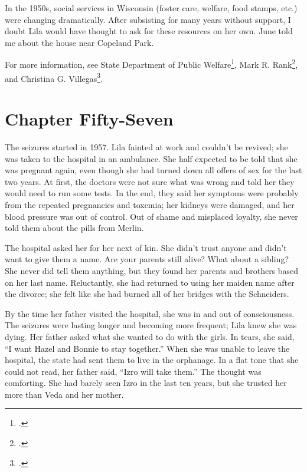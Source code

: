 \documentclass[
  letterpaper,
]{book}
\begin{document}
In the 1950s, social services in Wisconsin (foster care, welfare, food
stamps, etc.) were changing dramatically. After subsisting for many
years without support, I doubt Lila would have thought to ask for these
resources on her own. June told me about the house near Copeland Park.

For more information, see State Department of Public Welfare\footnote{.}, Mark R. Rank\footnote{.}, and Christina G. Villegas\footnote{.}.


\chapter{Chapter Fifty-Seven}\label{chapter-fifty-seven}

The seizures started in 1957. Lila fainted at work and couldn't be
revived; she was taken to the hospital in an ambulance. She half
expected to be told that she was pregnant again, even though she had
turned down all offers of sex for the last two years. At first, the
doctors were not sure what was wrong and told her they would need to run
some tests. In the end, they said her symptoms were probably from the
repeated pregnancies and toxemia; her kidneys were damaged, and her
blood pressure was out of control. Out of shame and misplaced loyalty,
she never told them about the pills from Merlin.

The hospital asked her for her next of kin. She didn't trust anyone and
didn't want to give them a name. Are your parents still alive? What
about a sibling? She never did tell them anything, but they found her
parents and brothers based on her last name. Reluctantly, she had
returned to using her maiden name after the divorce; she felt like she
had burned all of her bridges with the Schneiders.

By the time her father visited the hospital, she was in and out of
consciousness. The seizures were lasting longer and becoming more
frequent; Lila knew she was dying. Her father asked what she wanted to
do with the girls. In tears, she said, ``I want Hazel and Bonnie to stay
together.'' When she was unable to leave the hospital, the state had
sent them to live in the orphanage. In a flat tone that she could not
read, her father said, ``Izro will take them.'' The thought was
comforting. She had barely seen Izro in the last ten years, but she
trusted her more than Veda and her mother.
\end{document}
